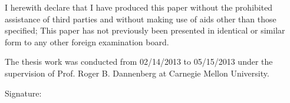

\begin{declaration}        %

I herewith declare that I have produced this paper without the prohibited 
assistance of third parties and without making use of aids other than those specified; 
This paper has not previously been presented in identical or similar form to any 
other foreign examination board.

The thesis work was conducted from 02/14/2013 to 05/15/2013 under the supervision 
of Prof. Roger B. Dannenberg at Carnegie Mellon University.

\vspace{10mm}
Signature: 

\end{declaration}


